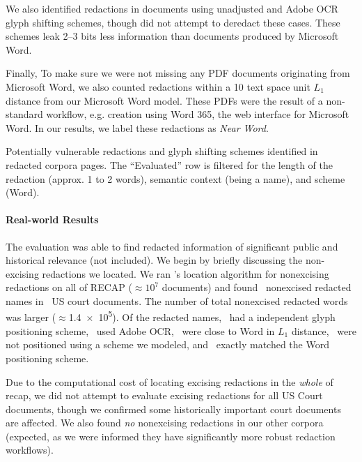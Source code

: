 We also identified redactions in documents using unadjusted and Adobe OCR glyph shifting schemes, though did not attempt to deredact these cases.
These schemes leak 2--3 bits less information than documents produced by Microsoft Word.

Finally, To make sure we were not missing any PDF documents originating from Microsoft Word, we also counted redactions within a 10 text space unit $L_{1}$ distance from our Microsoft Word model.
These PDFs were the result of a non-standard workflow, e.g. creation using Word 365, the web interface for Microsoft Word.
In our results, we label these redactions as \emph{Near Word}.

\begin{table}
  \centering
	\caption{Potentially vulnerable redactions and glyph shifting schemes identified in redacted corpora pages. The ``Evaluated'' row is filtered for the length of the redaction (approx. 1 to 2 words), semantic context (being a name), and scheme (Word).}
\label{tab:wildres}
\small
\end{table}


\paragraph{Real-world Results}
\label{sec:wildres}
The evaluation was able to find redacted information of significant public and historical relevance (not included).
We begin by briefly discussing the non-excising redactions we located.
We ran \maxray's location algorithm for nonexcising redactions on all of RECAP ($\approx10^{7}$ documents) and found \numRECAPNameredactions\ nonexcised redacted names in \numRECAPredactionDocs\ US court documents. 
The number of total nonexcised redacted words was larger ($\approx$\num{1.4e5}).
Of the redacted names, \numRECAPnadj\ had a independent glyph positioning scheme, \numRECAPocr\ used Adobe OCR, \numRECAPNearMSW\ were close to Word in $L_{1}$ distance, \numRECAPunk\ were not positioned using a scheme we modeled, and \numRECAPmsw\ exactly matched the Word positioning scheme.

Due to the computational cost of locating excising redactions in the \emph{whole} of recap, we did not attempt to evaluate excising redactions for all US Court documents, though we confirmed some historically important court documents are affected.
We also found \emph{no} nonexcising redactions in our other corpora (expected, as we were informed they have significantly more robust redaction workflows).

